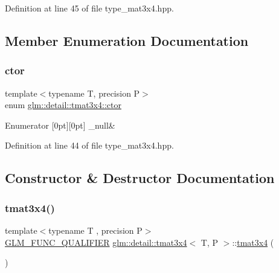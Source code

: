 Definition at line 45 of file type\+\_\+mat3x4.\+hpp.



\subsection{Member Enumeration Documentation}
\mbox{\label{structglm_1_1detail_1_1tmat3x4_aaf0d815b5c79dd7663c3532c8d03ade8}} 
\subsubsection{\texorpdfstring{ctor}{ctor}}
{\footnotesize\ttfamily template$<$typename T, precision P$>$ \\
enum \hyperlink{structglm_1_1detail_1_1tmat3x4_aaf0d815b5c79dd7663c3532c8d03ade8}{glm\+::detail\+::tmat3x4\+::ctor}}

\begin{DoxyEnumFields}{Enumerator}
[0pt][0pt]{}\mbox{\label{structglm_1_1detail_1_1tmat3x4_aaf0d815b5c79dd7663c3532c8d03ade8aa923bc7c1856abeda92ddb5f9fa621a8}} 
\+\_\+null&\\
\hline

\end{DoxyEnumFields}


Definition at line 44 of file type\+\_\+mat3x4.\+hpp.



\subsection{Constructor \& Destructor Documentation}
\mbox{\label{structglm_1_1detail_1_1tmat3x4_a6e581e5c4935bb4010e6ee4ae503290f}} 
\subsubsection{\texorpdfstring{tmat3x4()}{tmat3x4()}\hspace{0.1cm}{\footnotesize\ttfamily [1/22]}}
{\footnotesize\ttfamily template$<$typename T , precision P$>$ \\
\hyperlink{setup_8hpp_a33fdea6f91c5f834105f7415e2a64407}{G\+L\+M\+\_\+\+F\+U\+N\+C\+\_\+\+Q\+U\+A\+L\+I\+F\+I\+ER} \hyperlink{structglm_1_1detail_1_1tmat3x4}{glm\+::detail\+::tmat3x4}$<$ T, P $>$\+::\hyperlink{structglm_1_1detail_1_1tmat3x4}{tmat3x4} (\begin{DoxyParamCaption}{ }\end{DoxyParamCaption})}



